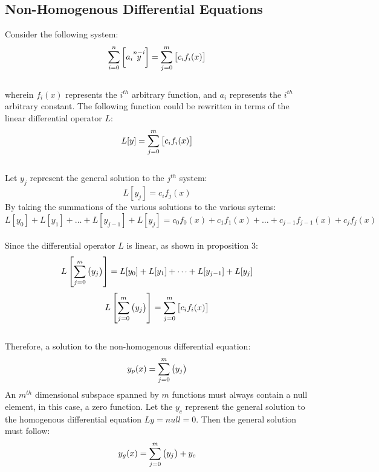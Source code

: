\documentclass[class=report, 12pt, crop=false]{standalone}
\begin{document}
\begin{center}
\section{Non-Homogenous Differential Equations}
\begin{comment}
\end{comment}
Consider the following system:
$$\sum_{i = 0}^{n}\left[a_i \overset{n - i}{y}\right] = \sum_{j = 0}^{m}\left[c_i f_i(x)\right]$$
\\wherein $f_i(x)$ represents the $i^{th}$ arbitrary function, and $a_i$ represents the $i^{th}$ arbitrary constant. The following function could be rewritten in terms of the linear differential operator $L$:
$$L[y] = \sum_{j = 0}^{m}\left[c_i f_i(x)\right]$$
\\Let $y_j$ represent the general solution to the $j^{th}$ system:
$$L[y_j] = c_i f_j(x)$$
By taking the summations of the various solutions to the various sytems:
$$L[y_0] + L[y_1] + \dots +L[y_{j - 1}] + L[y_j] = c_0 f_0(x) + c_1 f_1(x) + \dots + c_{j - 1} f_{j - 1}(x) + c_{j} f_j(x)$$
\\Since the differential operator $L$ is linear, as shown in proposition 3: 
$$L\left[\sum_{j = 0}^{m}\left(y_j\right)\right] = L[y_0] + L[y_1] + \dots +L[y_{j - 1}] + L[y_j]$$
$$L\left[\sum_{j = 0}^{m}\left(y_j\right)\right] =  \sum_{j = 0}^{m}\left[c_i f_i(x)\right] $$
\\Therefore, a solution to the non-homogenous differential equation:
$$y_p(x) = \sum_{j = 0}^{m}\left(y_j\right)$$ 
An $m^{th}$ dimensional subspace spanned by $m$ functions must always contain a null element, in this case, a zero function. Let the $y_c$ represent the general solution to the homogenous differential equation $Ly = null = 0$. Then the general solution must follow:
$$y_g(x) = \sum_{j = 0}^{m}\left(y_j\right) + y_c$$
\end{center}
\end{document}
